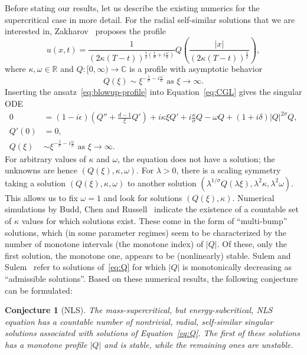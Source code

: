 \documentclass[11pt]{article}
\newtheorem{conjecture}[definition]{Conjecture}
\begin{document}
Before stating our results, let us describe the existing numerics for
the supercritical case in more detail. For the radial
self-similar solutions that we are interested in,
Zakharov~\cite{Zakharov84} proposes the profile
\begin{equation}
  \label{eq:blowup-profile}
  u(x, t) = \dfrac{1}{(2\kappa(T - t))^{\frac{1}{2}\left(\frac{1}{\sigma} + i \frac{\omega}{\kappa}\right)}}
  Q\left(\dfrac{|x|}{(2\kappa(T - t))^{\frac{1}{2}}}\right),
\end{equation}
where \(\kappa, \omega \in \mathbb{R}\) and
\(Q \colon [0, \infty) \to \mathbb{C}\) is a profile with asymptotic behavior
\begin{equation*}
  Q(\xi) \sim \xi^{-\frac{1}{\sigma} - i \frac{\omega}{\kappa}} \text{ as } \xi \to \infty.
\end{equation*}
Inserting the ansatz~\eqref{eq:blowup-profile} into
Equation~\eqref{eq:CGL} gives the singular ODE
\begin{align}
  \label{eq:Q}
  0 &= (1 - i\epsilon)\left(Q'' + \frac{d - 1}{\xi}Q'\right) + i\kappa\xi Q'
  + i \frac{\kappa}{\sigma}Q - \omega Q + (1 + i\delta)|Q|^{2\sigma}Q,\\
  Q'(0) &= 0,\nonumber\\
  Q(\xi) &\sim \xi^{-\frac{1}{\sigma} - i \frac{\omega}{\kappa}} \text{ as } \xi \to \infty.\nonumber
\end{align}
For arbitrary values of \(\kappa\) and \(\omega\), the equation does
not have a solution; the unknowns are hence
\((Q(\xi), \kappa, \omega)\). For \(\lambda > 0\), there is a scaling
symmetry taking a solution \((Q(\xi), \kappa, \omega)\) to another
solution
\((\lambda^{1/\sigma}Q(\lambda\xi), \lambda^{2}\kappa,
\lambda^{2}\omega)\). This allows us to fix \(\omega = 1\) and look
for solutions \((Q(\xi), \kappa)\). Numerical simulations by Budd,
Chen and Russell~\cite{Budd99} indicate the existence of a countable
set of \(\kappa\) values for which solutions exist. These come in the
form of ``multi-bump'' solutions, which (in some parameter regimes) seem
to be characterized by the number of monotone intervals (the monotone
index) of \(|Q|\). Of these, only the first solution, the monotone
one, appears to be (nonlinearly) stable. Sulem and
Sulem~\cite{Sulem1999} refer to solutions of~\eqref{eq:Q} for which
\(|Q|\) is monotonically decreasing as ``admissible solutions''. Based
on these numerical results, the following conjecture can be
formulated:

\begin{conjecture}[NLS]
  The mass-supercritical, but energy-subcritical, NLS equation has a
  countable number of nontrivial, radial, self-similar singular
  solutions associated with solutions of Equation~\eqref{eq:Q}. The
  first of these solutions has a monotone profile \(|Q|\) and is
  stable, while the remaining ones are unstable.
\end{conjecture}
\end{document}
